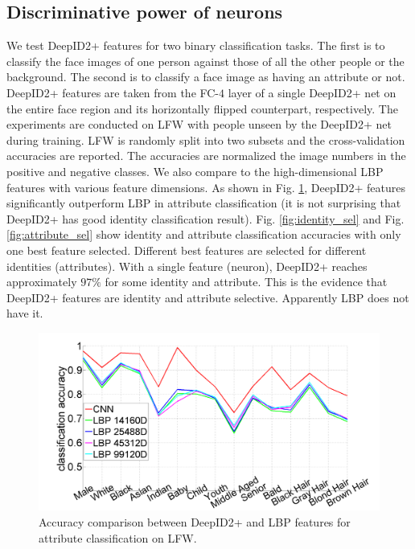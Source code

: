 \documentclass[10pt,twocolumn,letterpaper]{article}
\begin{document}
\subsection{Discriminative power of neurons}
We test DeepID2+ features for two binary classification tasks. The first is to classify the face images of one person against those of all the other people or the background. The second is to classify a face image as having an attribute or not. DeepID2+ features are taken from the FC-$4$ layer of a single DeepID2+ net on the entire face region and its horizontally flipped counterpart, respectively. The experiments are conducted on LFW with people unseen by the DeepID2+ net during training.  LFW is randomly split into two subsets and the cross-validation accuracies are reported. The accuracies are normalized \wrt the image numbers in the positive and negative classes. We also compare to the high-dimensional LBP features \cite{chen2013,cao2013} with various feature dimensions. As shown in Fig. \ref{fig:attribute_cv}, DeepID2+ features significantly outperform LBP in attribute classification (it is not surprising that DeepID2+ has good identity classification result). Fig. \ref{fig:identity_sel} and Fig. \ref{fig:attribute_sel} show identity and attribute classification accuracies with only one best feature selected. Different best features are selected for different identities (attributes). With a single feature (neuron), DeepID2+ reaches approximately $97\%$ for some identity and attribute. This is the evidence that DeepID2+ features are identity and attribute selective. Apparently LBP does not have it.

\begin{figure}[t]
\begin{center}
\includegraphics[width=1.0\linewidth]{picture/02.png}
\end{center}
\vspace{-0.15in}
\caption{Accuracy comparison between DeepID2+ and LBP features for attribute classification on LFW.}
\label{fig:attribute_cv}
\vspace{-0.1in}
\end{figure}
\end{document}
